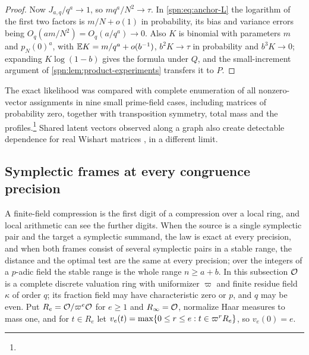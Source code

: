 \begin{proof}
Now $J_{a,q}/q^a\to1$, so $mq^a/N^2\to\tau$. In \eqref{spn:eq:anchor-L} the logarithm of the first two
factors is $m/N+o(1)$ in probability, its bias and variance errors being $O_q(am/N^2)=O_q(a/q^a)\to0$.
Also $K$ is binomial with parameters $m$ and $p_N(0)^a$, with $\mathbb{E} K=m/q^a+o(b^{-1})$, $b^2K\to\tau$ in
probability and $b^3K\to0$; expanding $K\log(1-b)$ gives the formula under $Q$, and the small-increment
argument of \cref{spn:lem:product-experiments} transfers it to $P$.
\end{proof}

The exact likelihood was compared with complete enumeration of all nonzero-vector assignments in nine
small prime-field cases, including matrices of probability zero, together with transposition symmetry,
total mass and the profiles.\footnote{}
Shared latent vectors observed along a graph also create detectable dependence for real Wishart matrices
\cite{BrennanBreslerHuang2021Finetti}, in a different limit.


\subsection{Symplectic frames at every congruence precision}\label{spn:sec:padic}

A finite-field compression is the first digit of a compression over a local ring, and local
arithmetic can see the further digits. When the source is a single symplectic pair and the target
a symplectic summand, the law is exact at every precision, and when both frames consist of several
symplectic pairs in a stable range, the distance and the optimal test are the same at every precision;
over the integers of a $p$-adic field the stable range is the whole range $n\ge a+b$. In this subsection $\mathcal{O}$ is a complete
discrete valuation ring with uniformizer $\varpi$ and finite residue field $\kappa$ of order $q$; its
fraction field may have characteristic zero or $p$, and $q$ may be even. Put
$R_e=\mathcal{O}/\varpi^e\mathcal{O}$ for $e\ge1$ and $R_\infty=\mathcal{O}$, normalize Haar measures to mass one, and
for $t\in R_e$ let $v_e(t)=\max\{0\le r\le e:t\in\varpi^rR_e\}$, so $v_e(0)=e$.

